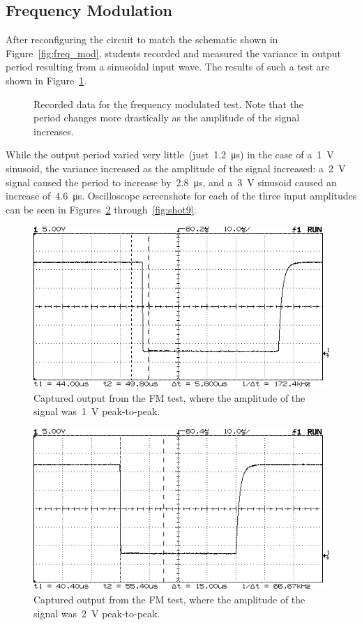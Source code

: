 \subsection{Frequency Modulation}
After reconfiguring the circuit to match the schematic shown in
Figure~\ref{fig:freq_mod}, students recorded and measured the variance in
output period resulting from a sinusoidal input wave.  The results of such a
test are shown in Figure~\ref{fig:freq_mod_period}.
%
\begin{figure}[H]
	\centering
	
	\parbox{.6\textwidth}{
	\caption[Frequency Modulation --- Period Variance]{Recorded data for the
	frequency modulated test.  Note that the period changes more drastically as
	the amplitude of the signal increases.}
	\label{fig:freq_mod_period}}
\end{figure}
%
While the output period varied very little~(just~\SI{1.2}{\micro\second}) in
the case of a~\SI{1}{\volt} sinusoid, the variance increased as the amplitude
of the signal increased: a~\SI{2}{\volt} signal caused the period to increase
by~\SI{2.8}{\micro\second}, and a~\SI{3}{\volt} sinusoid caused an increase
of~\SI{4.6}{\micro\second}.
%
Oscilloscope screenshots for each of the three input amplitudes can be seen in
Figures~\ref{fig:shot7} through~\ref{fig:shot9}.
%
\begin{figure}[H]
	\centering
	\includegraphics[width=.6\textwidth]{img/shot/shot7.png}
	\parbox{.6\textwidth}{
	\caption[Frequency Modulation --- \SI{1}{\volt} peak-to-peak]{Captured
	output from the FM test, where the amplitude of the signal
	was~\SI{1}{\volt} peak-to-peak.}
	\label{fig:shot7}}
\end{figure}
%
\begin{figure}[H]
	\centering
	\includegraphics[width=.6\textwidth]{img/shot/shot8.png}
	\parbox{.6\textwidth}{
	\caption[Frequency Modulation --- \SI{2}{\volt} peak-to-peak]{Captured
	output from the FM test, where the amplitude of the signal
	was~\SI{2}{\volt} peak-to-peak.}
	\label{fig:shot8}}
\end{figure}
